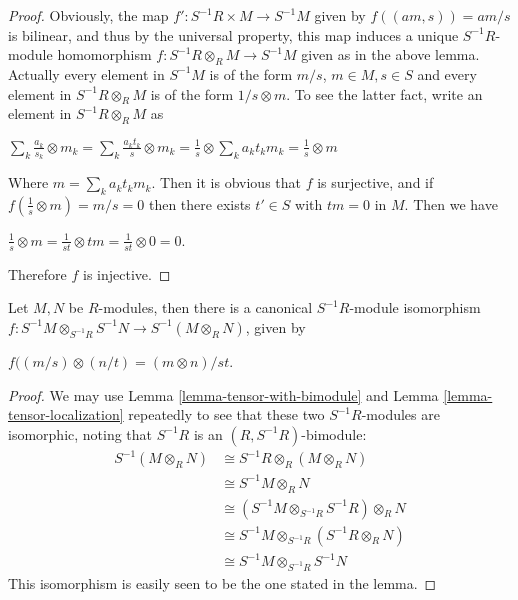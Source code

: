\begin{proof}
Obviously, the map
$f' : S^{-1}R\times M\rightarrow S^{-1}M$ given by $f((am, s)) = am/s$ is
bilinear, and thus by the
universal property, this map induces a unique $S^{-1}R$-module homomorphism
$f : S^{-1}R\otimes_{R}M\rightarrow S^{-1}M$ given as in the above lemma.
Actually every element in $S^{-1}M$ is of the form $m/s$, $m\in M, s\in S$ and
every element in
$S^{-1}R\otimes_{R}M$ is of the form $1/s \otimes m$. To see the latter fact,
write an element in
$S^{-1}R\otimes_{R}M$ as
\begin{center}
$\sum_{k}\frac{a_k}{s_k}\otimes m_k = \sum_{k}\frac{a_{k}t_k}{s}\otimes
m_k = \frac{1}{s}\otimes\sum_{k}{a_{k}t_k}m_k = \frac{1}{s}\otimes m$
\end{center}
Where $m = \sum_{k}{a_{k}t_k}m_k$. Then it is obvious that $f$ is surjective,
and if $f(\frac{1}{s}\otimes m) = m/s = 0$ then there exists $t'\in S$ with
$tm = 0$ in $M$. Then we have
\begin{center}
$\frac{1}{s} \otimes m = \frac{1}{st} \otimes tm = \frac{1}{st} \otimes 0 = 0$.
\end{center}
Therefore $f$ is injective.
\end{proof}

\begin{lemma}
\label{lemma-tensor-product-localization}
Let $M, N$ be $R$-modules, then there is a canonical
$S^{-1}R$-module isomorphism
$f : S^{-1}M\otimes_{S^{-1}R}S^{-1}N \rightarrow S^{-1}(M\otimes_{R} N)$,
given by
\begin{center}
$f((m/s)\otimes(n/t) = (m\otimes n)/st$.
\end{center}
\end{lemma}

\begin{proof}
We may use Lemma \ref{lemma-tensor-with-bimodule}
and Lemma \ref{lemma-tensor-localization} repeatedly to
see that these two
$S^{-1}R$-modules are isomorphic, noting that $S^{-1}R$ is an
$(R, S^{-1}R)$-bimodule:
\begin{align}
S^{-1}(M\otimes_{R} N) &\cong S^{-1}R\otimes_R (M\otimes_R N)\\
 &\cong S^{-1}M\otimes_R N\\
 &\cong (S^{-1}M\otimes_{S^{-1}R}S^{-1}R)\otimes_R N\\
 &\cong S^{-1}M\otimes_{S^{-1}R}(S^{-1}R\otimes_R N)\\
 &\cong S^{-1}M\otimes_{S^{-1}R}S^{-1}N
\end{align}
This isomorphism is easily seen to be the one stated in the lemma.
\end{proof}


















